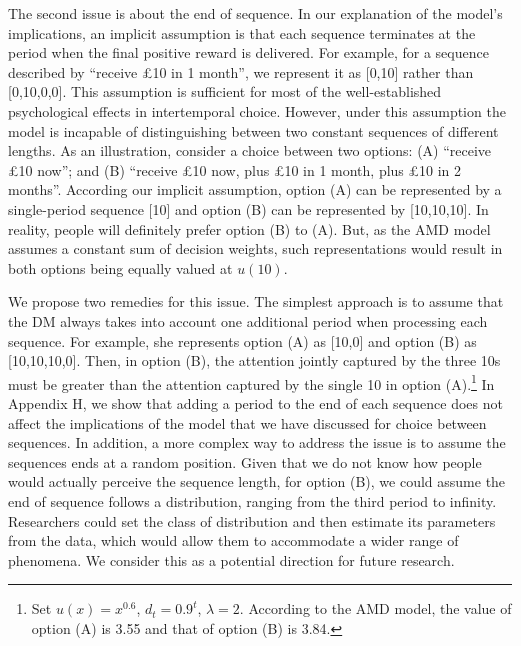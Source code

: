 \documentclass[
  12pt,
]{article}
\begin{document}
The second issue is about the end of sequence. In our explanation of the
model's implications, an implicit assumption is that each sequence
terminates at the period when the final positive reward is delivered.
For example, for a sequence described by ``receive £10 in 1 month'', we
represent it as {[}0,10{]} rather than {[}0,10,0,0{]}. This assumption
is sufficient for most of the well-established psychological effects in
intertemporal choice. However, under this assumption the model is
incapable of distinguishing between two constant sequences of different
lengths. As an illustration, consider a choice between two options: (A)
``receive £10 now''; and (B) ``receive £10 now, plus £10 in 1 month,
plus £10 in 2 months''. According our implicit assumption, option (A)
can be represented by a single-period sequence {[}10{]} and option (B)
can be represented by {[}10,10,10{]}. In reality, people will definitely
prefer option (B) to (A). But, as the AMD model assumes a constant sum
of decision weights, such representations would result in both options
being equally valued at \(u(10)\).

We propose two remedies for this issue. The simplest approach is to
assume that the DM always takes into account one additional period when
processing each sequence. For example, she represents option (A) as
{[}10,0{]} and option (B) as {[}10,10,10,0{]}. Then, in option (B), the
attention jointly captured by the three 10s must be greater than the
attention captured by the single 10 in option (A).\footnote{Set
  \(u(x)=x^{0.6}\), \(d_t=0.9^t\), \(\lambda=2\). According to the AMD
  model, the value of option (A) is 3.55 and that of option (B) is 3.84.}
In Appendix H, we show that adding a period to the end of each sequence
does not affect the implications of the model that we have discussed for
choice between sequences. In addition, a more complex way to address the
issue is to assume the sequences ends at a random position. Given that
we do not know how people would actually perceive the sequence length,
for option (B), we could assume the end of sequence follows a
distribution, ranging from the third period to infinity. Researchers
could set the class of distribution and then estimate its parameters
from the data, which would allow them to accommodate a wider range of
phenomena. We consider this as a potential direction for future
research.
\end{document}
